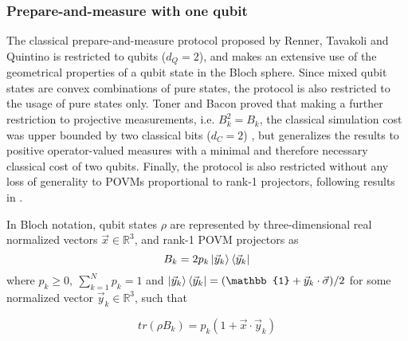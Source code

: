 \subsubsection{Prepare-and-measure with one qubit}\label{section:protocol_pm}
The classical prepare-and-measure protocol proposed by Renner, Tavakoli and Quintino \cite{renner2023} is restricted to qubits ($d_Q=2$), and makes an extensive use of the geometrical properties of a qubit state in the Bloch sphere. Since mixed qubit states are convex combinations of pure states, the protocol is also restricted to the usage of pure states only. Toner and Bacon proved that making a further restriction to projective measurements, i.e. $B_{k}^{2} = B_{k}$, the classical simulation cost was upper bounded by two classical bits ($d_C=2$) \cite{toner2003}, but \cite{renner2023} generalizes the results to positive operator-valued measures with a minimal and therefore necessary classical cost of two qubits. Finally, the protocol is also restricted without any loss of generality to POVMs proportional to rank-1 projectors, following results in \cite{barrett2002}.

In Bloch notation, qubit states $\rho$ are represented by three-dimensional real normalized vectors $\vec{x} \in \mathbb{R}^{3}$, and rank-1 POVM projectors as 
\begin{equation}\label{eq:rank1_povm}
B_{k} = 2p_{k}\ket{\vec{y}_{k}}\bra{\vec{y}_{k}}
\end{equation}
where $p_{k}\ge0,\ \sum_{k=1}^{N}p_{k}=1$ and $\ket{\vec{y}_{k}}\bra{\vec{y}_{k}} = (\mathbb{1} + \vec{y}_{k} \cdot \vec{\sigma})/2$ for some normalized vector $\vec{y}_{k} \in \mathbb{R}^{3}$, such that

\begin{equation}
tr(\rho B_{k}) = p_{k}(1 + \vec{x} \cdot \vec{y}_{k}) 
\end{equation}

